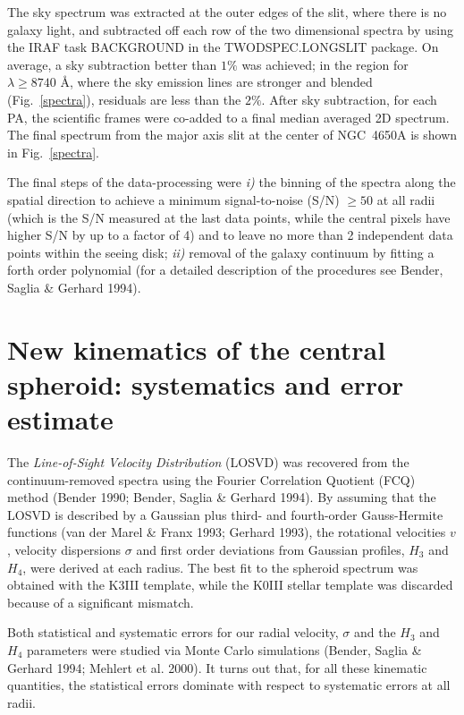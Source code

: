 \documentclass[12pt,preprint]{aastex}
\begin{document}
The sky spectrum was extracted at the outer edges of the slit, where
there is no galaxy light, and subtracted off each row of the two
dimensional spectra by using the IRAF task BACKGROUND in the
TWODSPEC.LONGSLIT package. On average, a sky subtraction better than
$1\%$ was achieved; in the region for $\lambda \ge 8740$ \AA, where
the sky emission lines are stronger and blended (Fig.~\ref{spectra}),
residuals are less than the $2\%$.  After sky subtraction, for each
PA, the scientific frames were co-added to a final median averaged 2D
spectrum.  The final spectrum from the major axis slit at the center
of NGC~4650A is shown in Fig.~\ref{spectra}.

The final steps of the data-processing were {\it i)} the binning of
the spectra along the spatial direction to achieve a minimum
signal-to-noise (S/N) $\ge 50$ at all radii (which is the S/N measured
at the last data points, while the central pixels have higher S/N by
up to a factor of 4) and to leave no more than 2 independent data
points within the seeing disk; {\it ii)} removal of the galaxy
continuum by fitting a forth order polynomial (for a detailed
description of the procedures see Bender, Saglia \& Gerhard 1994).

\section{New kinematics of the central spheroid: systematics and
error estimate}\label{kin}

The {\it Line-of-Sight Velocity Distribution} (LOSVD) was recovered
from the continuum-removed spectra using the Fourier Correlation
Quotient (FCQ) method (Bender 1990; Bender, Saglia \& Gerhard 1994).
By assuming that the LOSVD is described by a Gaussian plus third- and
fourth-order Gauss-Hermite functions (van der Marel \& Franx 1993;
Gerhard 1993), the rotational velocities $v$, velocity
dispersions $\sigma$ and first order deviations from Gaussian
profiles, $H_3$ and $H_4$, were derived at each radius.  The best fit
to the spheroid spectrum was obtained with the K3III template,
while the K0III stellar template was discarded because of a
significant mismatch.
  
Both statistical and systematic errors for our radial velocity,
$\sigma $ and the $H_3$ and $H_4$ parameters were studied via Monte
Carlo simulations (Bender, Saglia \& Gerhard 1994; Mehlert et
al. 2000).  It turns out that, for all these kinematic quantities, the
statistical errors dominate with respect to systematic errors at all
radii.
\end{document}
